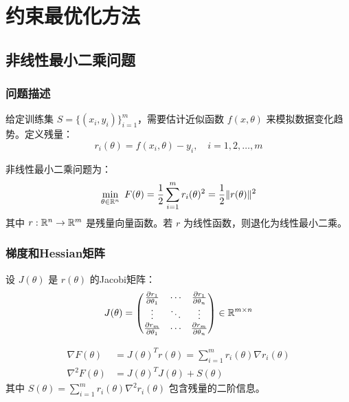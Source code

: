 \chapter{约束最优化方法}\label{chap:constrained-methods}
\section{非线性最小二乘问题}\label{sec:nls}

\subsection{问题描述}

\begin{definition}[非线性最小二乘问题]
给定训练集 $S = \{(x_i, y_i)\}_{i=1}^{m}$，需要估计近似函数 $f(x, \theta)$ 来模拟数据变化趋势。定义残量：
\[
r_i(\theta) = f(x_i, \theta) - y_i,\quad i = 1, 2, \ldots, m
\]

非线性最小二乘问题为：
\[
\min_{\theta \in \mathbb{R}^n}\ F(\theta) = \frac{1}{2}\sum_{i=1}^{m} r_i(\theta)^2 = \frac{1}{2}\|r(\theta)\|^2
\]
其中 $r: \mathbb{R}^n \to \mathbb{R}^m$ 是残量向量函数。若 $r$ 为线性函数，则退化为线性最小二乘。
\end{definition}

\subsection{梯度和Hessian矩阵}

设 $J(\theta)$ 是 $r(\theta)$ 的Jacobi矩阵：
\[
J(\theta) = \begin{pmatrix}
\frac{\partial r_1}{\partial \theta_1} & \cdots & \frac{\partial r_1}{\partial \theta_n} \\
\vdots & \ddots & \vdots \\
\frac{\partial r_m}{\partial \theta_1} & \cdots & \frac{\partial r_m}{\partial \theta_n}
\end{pmatrix} \in \mathbb{R}^{m \times n}
\]

\begin{property}[梯度和Hessian]
\begin{align*}
\nabla F(\theta) &= J(\theta)^T r(\theta) = \sum_{i=1}^{m} r_i(\theta) \nabla r_i(\theta) \\
\nabla^2 F(\theta) &= J(\theta)^T J(\theta) + S(\theta)
\end{align*}
其中 $S(\theta) = \sum_{i=1}^{m} r_i(\theta) \nabla^2 r_i(\theta)$ 包含残量的二阶信息。
\end{property}

